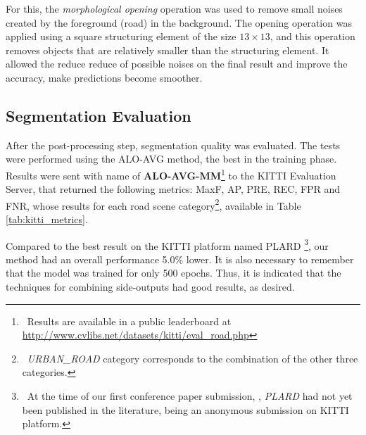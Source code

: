 For this, the \textit{morphological opening} operation was used to remove small noises created by the foreground (road) in the background.
The opening operation was applied using a square structuring element of the size $13 \times 13$, and this operation removes objects that are relatively smaller than the structuring element.
It allowed the reduce reduce of possible noises on the final result and improve the accuracy, make predictions become smoother.

% 

\subsection{Segmentation Evaluation}
\label{cap6_resultados_segmentacao}

After the post-processing step, segmentation quality was evaluated.
The tests were performed using the ALO-AVG method, the best in the training phase.
Results were sent with name of \textbf{ALO-AVG-MM}\footnote{~Results are available in a public leaderboard at \url{http://www.cvlibs.net/datasets/kitti/eval_road.php}} to the KITTI Evaluation Server, that returned the following metrics: MaxF, AP, PRE, REC, FPR and FNR, whose results for each road scene category\footnote{~\textit{URBAN\_ROAD} category corresponds to the combination of the other three categories.}, available in Table \ref{tab:kitti_metrics}.



{\color{red}
Compared to the best result on the KITTI platform named PLARD \cite{Chen:2019}\footnote{~At the time of our first conference paper submission, \cite{Reis:2019}, \textit{PLARD} had not yet been published in the literature, being an anonymous submission on KITTI platform.}, our method had an overall performance 5.0\% lower.
}
It is also necessary to remember that the model was trained for only 500 epochs.
Thus, it is indicated that the techniques for combining side-outputs had good results, as desired.

